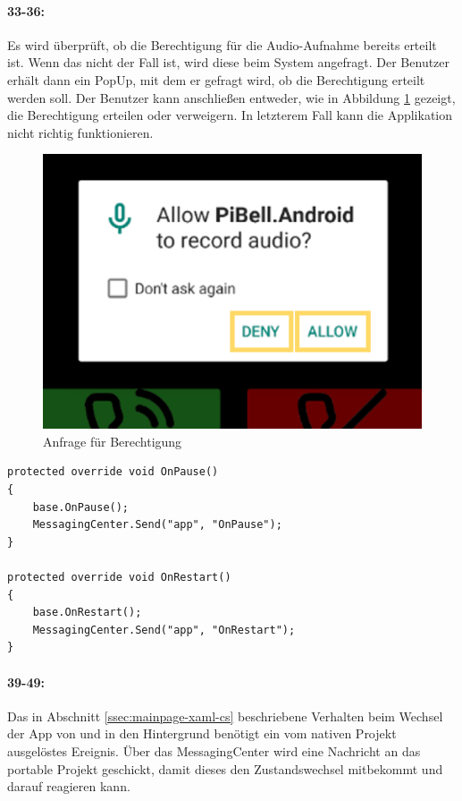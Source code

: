 \paragraph{33-36:} Es wird überprüft, ob die Berechtigung für die Audio-Aufnahme bereits erteilt ist.
Wenn das nicht der Fall ist, wird diese beim System angefragt.
Der Benutzer erhält dann ein PopUp, mit dem er gefragt wird, ob die Berechtigung erteilt werden soll.
Der Benutzer kann anschließen entweder, wie in Abbildung \ref{fig:permission} gezeigt, die Berechtigung erteilen oder verweigern.
In letzterem Fall kann die Applikation nicht richtig funktionieren.
\begin{figure}
    \centering
    \includegraphics[width=.5\linewidth]{images/xamarin/permissionRequest.png}
    \caption{Anfrage für Berechtigung}
    \label{fig:permission}
\end{figure}

\begin{verbatim}
protected override void OnPause()
{
    base.OnPause();
    MessagingCenter.Send("app", "OnPause");
}

protected override void OnRestart()
{
    base.OnRestart();
    MessagingCenter.Send("app", "OnRestart");
}
\end{verbatim}
\paragraph{39-49:} Das in Abschnitt \ref{ssec:mainpage-xaml-cs} beschriebene Verhalten beim Wechsel der App von und in den Hintergrund benötigt ein vom nativen Projekt ausgelöstes Ereignis.
Über das MessagingCenter wird eine Nachricht an das portable Projekt geschickt, damit dieses den Zustandswechsel mitbekommt und darauf reagieren kann.
